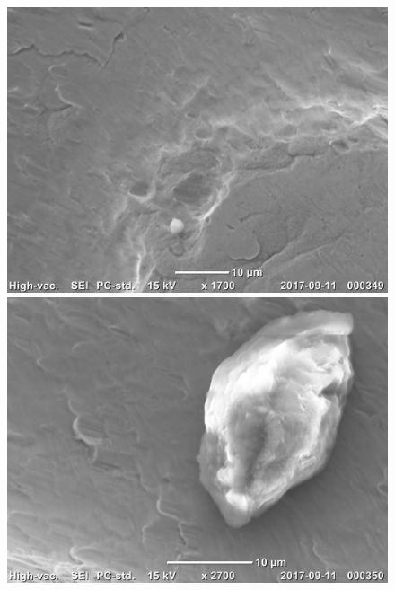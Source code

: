 \documentclass[12pt]{article}
\begin{document}
\begin{figure}[t!]
\includegraphics[width=0.5\linewidth]{pictures/20170911_000349.jpg}
\includegraphics[width=0.5\linewidth]{pictures/20170911_000350.jpg}
\end{figure}
\end{document}
